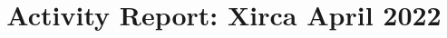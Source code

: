\documentclass[table,dvipsnames]{beamer}
\title[Xirca042022]{Activity Report: Xirca April 2022}
\author{}
\institute[VibrasticLab : \ccbysa]{
	Achmadi ST MT
}
\date{}
\begin{document}
    \begin{frame}
        \titlepage
    \end{frame}
\end{document}
